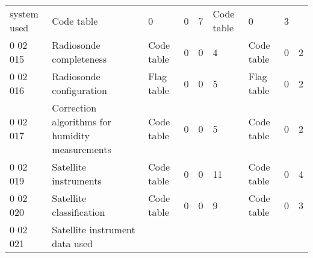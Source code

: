 \begin{longtable}[]{@{}lllllllll@{}}
\begin{minipage}[t]{0.08\columnwidth}
system used\strut
\end{minipage} & \begin{minipage}[t]{0.08\columnwidth}\raggedright
Code table\strut
\end{minipage} & \begin{minipage}[t]{0.08\columnwidth}\raggedright
0\strut
\end{minipage} & \begin{minipage}[t]{0.08\columnwidth}\raggedright
0\strut
\end{minipage} & \begin{minipage}[t]{0.08\columnwidth}\raggedright
7\strut
\end{minipage} & \begin{minipage}[t]{0.08\columnwidth}\raggedright
Code table\strut
\end{minipage} & \begin{minipage}[t]{0.08\columnwidth}\raggedright
0\strut
\end{minipage} & \begin{minipage}[t]{0.08\columnwidth}\raggedright
3\strut
\end{minipage}\tabularnewline
0 02 015 & Radiosonde completeness & Code table & 0 & 0 & 4 & Code table & 0 & 2\tabularnewline
0 02 016 & Radiosonde configuration & Flag table & 0 & 0 & 5 & Flag table & 0 & 2\tabularnewline
0 02 017 & Correction algorithms for humidity measurements & Code table & 0 & 0 & 5 & Code table & 0 & 2\tabularnewline
0 02 019 & Satellite instruments & Code table & 0 & 0 & 11 & Code table & 0 & 4\tabularnewline
0 02 020 & Satellite classification & Code table & 0 & 0 & 9 & Code table & 0 & 3\tabularnewline
\begin{minipage}[t]{0.08\columnwidth}\raggedright
0 02 021\strut
\end{minipage} & \begin{minipage}[t]{0.08\columnwidth}\raggedright
Satellite instrument data used


\end{minipage}
\end{longtable}
